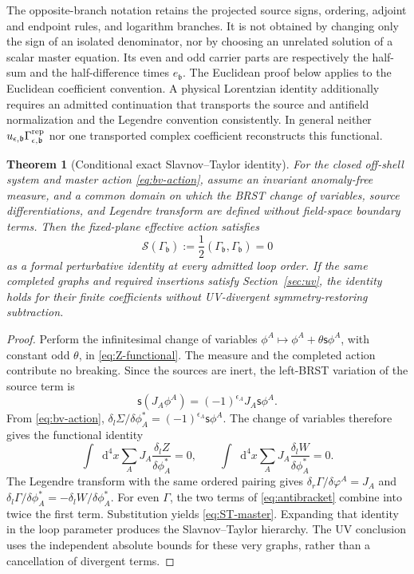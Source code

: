 \documentclass[final,5p,times,twocolumn,numbers,nopreprintline]{elsarticle}
\numberwithin{equation}{section}
\newtheorem{theorem}{Theorem}[section]
\theoremstyle{definition}
\theoremstyle{remark}
\newcommand{\dd}{\mathop{}\!\mathrm d}
\newcommand{\bb}{\mathfrak b}
\newcommand{\BR}{\mathsf s}
\newcommand{\ee}{e_{\bb}}
\begin{document}
The opposite-branch notation retains the projected source signs,
ordering, adjoint and endpoint rules, and logarithm branches. It is
not obtained by changing only the sign of an isolated denominator,
nor by choosing an unrelated solution of a scalar master equation.
Its even and odd carrier parts are respectively the half-sum and
the half-difference times \(\ee\). The Euclidean proof below
applies to the Euclidean coefficient convention. A physical
Lorentzian identity additionally requires an admitted continuation
that transports the source and antifield normalization and the
Legendre convention consistently. In general neither
\(u_{\epsilon,\bb}\Gamma^{\rm rep}_{\epsilon,\bb}\) nor one
transported complex coefficient reconstructs this functional.

\begin{theorem}[Conditional exact Slavnov--Taylor identity]
\label{thm:ST}
For the closed off-shell system and master action
\eqref{eq:bv-action}, assume an invariant
anomaly-free measure, and a common domain on which the BRST change
of variables, source differentiations, and Legendre transform are
defined without field-space boundary terms. Then the fixed-plane
effective action satisfies
\begin{equation}
 \mathcal S(\Gamma_{\bb})
      :=\frac12(\Gamma_{\bb},\Gamma_{\bb})=0
 \label{eq:ST-master}
\end{equation}
as a formal perturbative identity at every admitted loop order.
If the same completed graphs and required insertions satisfy
Section~\ref{sec:uv}, the identity holds for their finite
coefficients without UV-divergent symmetry-restoring subtraction.
\end{theorem}

\begin{proof}
Perform the infinitesimal change of variables
\(\phi^A\mapsto\phi^A+\theta\BR\phi^A\), with constant odd
\(\theta\), in \eqref{eq:Z-functional}.
The measure and the completed action contribute no breaking.
Since the sources are inert, the left-BRST variation of the source
term is
\[
 \BR(J_A\phi^A)=(-1)^{\epsilon_A}J_A\BR\phi^A .
\]
From \eqref{eq:bv-action},
\(\delta_l\Sigma/\delta\phi_A^*
   =(-1)^{\epsilon_A}\BR\phi^A\).
The change of variables therefore gives the functional identity
\begin{equation}
 \int\dd^4x\sum_A J_A
       \frac{\delta_l Z}{\delta\phi_A^*}=0,
 \qquad
 \int\dd^4x\sum_A J_A
       \frac{\delta_l W}{\delta\phi_A^*}=0.
 \label{eq:Z-W-identity}
\end{equation}
The Legendre transform with the same ordered pairing gives
\(\delta_r\Gamma/\delta\varphi^A=J_A\) and
\(\delta_l\Gamma/\delta\phi_A^*
      =-\delta_lW/\delta\phi_A^*\).
For even \(\Gamma\), the two terms of
\eqref{eq:antibracket} combine into twice the first term.
Substitution yields \eqref{eq:ST-master}.
Expanding that identity in the loop parameter produces the
Slavnov--Taylor hierarchy. The UV conclusion uses the independent
absolute bounds for these very graphs, rather than a cancellation
of divergent terms.
\end{proof}
\end{document}
